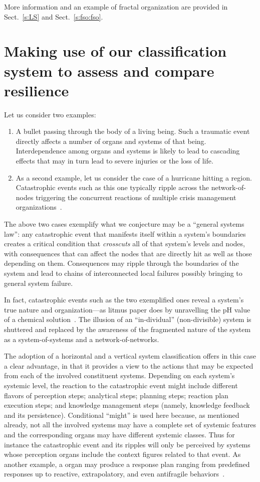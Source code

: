 \documentclass[twocolumn]{svjour3}
\def\P{\hbox{}}
\begin{document}
More information and an example of fractal organization are provided in Sect.~\ref{s:LS}
and Sect.~\ref{s:fso:fso}.


\section{Making use of our classification system to assess and compare resilience}\label{s:res}


Let us consider two examples:
\begin{enumerate}
\item A bullet passing through the body of a living being.
Such a traumatic event directly affects a number of organs and systems of that being.
Interdependence among organs and systems is likely to lead to cascading effects
that may in turn lead to severe injuries or the loss of life.
\item As a second example, let us consider the case of a hurricane hitting a region.
Catastrophic events such as this one typically ripple across the network-of-nodes
triggering the concurrent reactions of multiple crisis management organizations~\cite{CARRI3,RAND}.
\end{enumerate}

The above two cases exemplify what we conjecture may be a ``general systems law'':
any catastrophic event that manifests itself within a system's boundaries
creates a critical condition that \emph{crosscuts\/} all of that system's
levels and nodes, with consequences that can affect the nodes that are directly hit
as well as those depending on them. Consequences may ripple through the boundaries
of the system and lead to chains of interconnected local failures possibly bringing
to general system failure.

In fact, catastrophic events such as the two exemplified ones
reveal a system's true nature and organization---as litmus paper
does by unravelling the pH value of a chemical solution~\cite{Litmus}.
The illusion of an ``in-dividual'' (non-divisible) system is shuttered and replaced by the awareness
of the fragmented nature of the system as a system-of-systems and a network-of-networks.

The adoption of a horizontal and a vertical system classification offers in this case
a clear advantage, in that it provides a view to the actions that may be
expected from each of the involved constituent systems.
Depending on each system's systemic level, the reaction to the catastrophic event might include
different flavors of
perception steps; analytical steps; planning steps; reaction
plan execution steps; and knowledge management steps (namely, knowledge feedback and its persistence).
Conditional ``might'' is used here
because, as mentioned already, not all the involved systems may have a complete set of systemic features
and the corresponding organs may have different systemic classes.
Thus for instance the catastrophic event and its ripples will only be perceived by systems
whose perception organs include the
context figures related to that event. As another example, a \P{} organ may produce a
response plan ranging from predefined responses up to reactive, extrapolatory,
and even antifragile behaviors~\cite{DF15b}.
\end{document}

